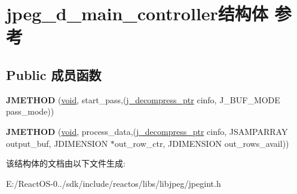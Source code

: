 \hypertarget{structjpeg__d__main__controller}{}\section{jpeg\+\_\+d\+\_\+main\+\_\+controller结构体 参考}
\label{structjpeg__d__main__controller}
\subsection*{Public 成员函数}
\begin{DoxyCompactItemize}
\item 
\mbox{\label{structjpeg__d__main__controller_a6fd68ad0d0296dcc299119db1128c294}} 
{\bfseries J\+M\+E\+T\+H\+OD} (\hyperlink{interfacevoid}{void}, start\+\_\+pass,(\hyperlink{structjpeg__decompress__struct}{j\+\_\+decompress\+\_\+ptr} cinfo, J\+\_\+\+B\+U\+F\+\_\+\+M\+O\+DE pass\+\_\+mode))
\item 
\mbox{\label{structjpeg__d__main__controller_affd488d3ef78b5080ec5b2a00c8198a5}} 
{\bfseries J\+M\+E\+T\+H\+OD} (\hyperlink{interfacevoid}{void}, process\+\_\+data,(\hyperlink{structjpeg__decompress__struct}{j\+\_\+decompress\+\_\+ptr} cinfo, J\+S\+A\+M\+P\+A\+R\+R\+AY output\+\_\+buf, J\+D\+I\+M\+E\+N\+S\+I\+ON $\ast$out\+\_\+row\+\_\+ctr, J\+D\+I\+M\+E\+N\+S\+I\+ON out\+\_\+rows\+\_\+avail))
\end{DoxyCompactItemize}


该结构体的文档由以下文件生成\+:\begin{DoxyCompactItemize}
\item 
E\+:/\+React\+O\+S-\/0../sdk/include/reactos/libs/libjpeg/jpegint.\+h\end{DoxyCompactItemize}
